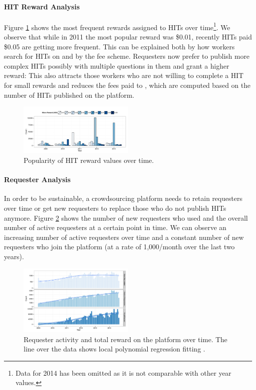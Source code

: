 \paragraph{HIT Reward Analysis}
Figure \ref{fig:reward_year} shows the most frequent rewards assigned to HITs over time\footnote{Data for 2014 has been omitted as it is not comparable with other year values.}. We observe that while in 2011 the most popular reward was \$0.01, recently HITs paid \$0.05 are getting more frequent. This can be explained both by how workers search for HITs on \amt{} and by the \amt{} fee scheme. Requesters now prefer to publish more complex HITs possibly with multiple questions in them and grant a higher reward: This also attracts those workers who are not willing to complete a HIT for small rewards and reduces the fees paid to \amt{}, which are computed based on the number of HITs published on the platform.

\begin{figure}[tb]
	\centering
		\includegraphics[width=0.5\textwidth]{figures/reward_year}
	\caption{Popularity of HIT reward values over time.}
	\label{fig:reward_year}
\end{figure}



\paragraph{Requester Analysis}
In order to be sustainable, a crowdsourcing platform needs to retain requesters over time or get new requesters to replace those who do not publish HITs anymore. Figure \ref{fig:requesters_reward} shows the number of new requesters who used \amt{} and the overall number of active requesters at a certain point in time. We can observe an increasing number of active requesters over time and a constant number of new requesters who join the platform (at a rate of 1,000/month over the last two years).

\begin{figure}[tb]
	\centering
		\includegraphics[width=0.5\textwidth]{figures/requesters_reward}
	\caption{Requester activity and total reward on the platform over time. The line over the data shows local polynomial regression fitting \cite{cleveland1992local}.}
	\label{fig:requesters_reward}
\end{figure}

